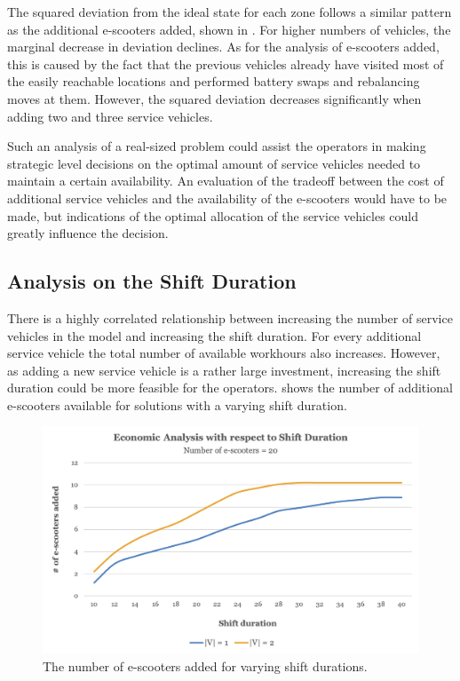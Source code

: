 The squared deviation from the ideal state for each zone follows a similar pattern as the additional e-scooters added, shown in . For higher numbers of vehicles, the marginal decrease in deviation declines. As for the analysis of e-scooters added, this is caused by the fact that the previous vehicles already have visited most of the easily reachable locations and performed battery swaps and rebalancing moves at them. However, the squared deviation decreases significantly when adding two and three service vehicles.

Such an analysis of a real-sized problem could assist the operators in making strategic level decisions on the optimal amount of service vehicles needed to maintain a certain availability. An evaluation of the tradeoff between the cost of additional service vehicles and the availability of the e-scooters would have to be made, but indications of the optimal allocation of the service vehicles could greatly influence the decision.

\subsection{Analysis on the Shift Duration}

There is a highly correlated relationship between increasing the number of service vehicles in the model and increasing the shift duration. For every additional service vehicle the total number of available workhours also increases. However, as adding a new service vehicle is a rather large investment, increasing the shift duration could be more feasible for the operators.  shows the number of additional e-scooters available for solutions with a varying shift duration. 

\begin{figure}[H]
    \centering
    \includegraphics[width=0.8\columnwidth]{Images/Computational Study/econ_shift_dur.png}
    \caption{The number of e-scooters added for varying shift durations.}
    \label{fig:econ_t_max}
\end{figure}

